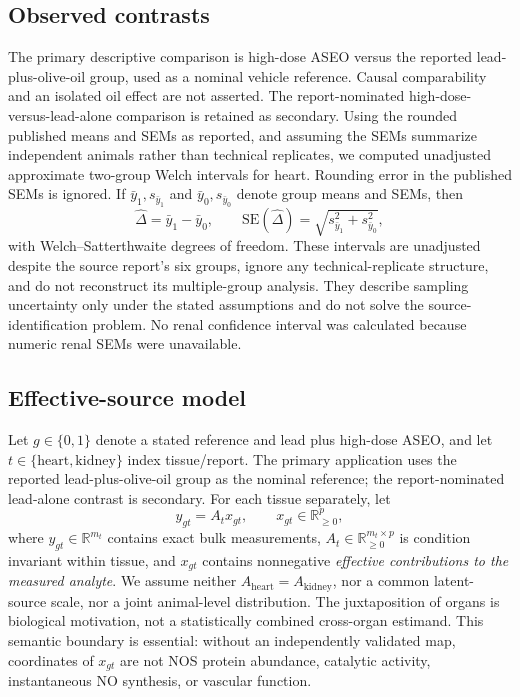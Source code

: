 \documentclass[11pt]{article}
\newcommand{\Rplus}{\mathbb{R}_{\geq 0}}
\begin{document}
\subsection{Observed contrasts}

The primary descriptive comparison is high-dose ASEO versus the reported lead-plus-olive-oil group, used as a nominal vehicle reference. Causal comparability and an isolated oil effect are not asserted. The report-nominated high-dose-versus-lead-alone comparison is retained as secondary. Using the rounded published means and SEMs as reported, and assuming the SEMs summarize independent animals rather than technical replicates, we computed unadjusted approximate two-group Welch intervals for heart. Rounding error in the published SEMs is ignored. If $\bar y_1, s_{\bar y_1}$ and $\bar y_0, s_{\bar y_0}$ denote group means and SEMs, then
\[
\widehat{\Delta}=\bar y_1-\bar y_0,\qquad
\mathrm{SE}(\widehat{\Delta})=\sqrt{s_{\bar y_1}^2+s_{\bar y_0}^2},
\]
with Welch--Satterthwaite degrees of freedom. These intervals are unadjusted despite the source report's six groups, ignore any technical-replicate structure, and do not reconstruct its multiple-group analysis. They describe sampling uncertainty only under the stated assumptions and do not solve the source-identification problem. No renal confidence interval was calculated because numeric renal SEMs were unavailable.

\subsection{Effective-source model}

Let $g\in\{0,1\}$ denote a stated reference and lead plus high-dose ASEO, and let $t\in\{\mathrm{heart},\mathrm{kidney}\}$ index tissue/report. The primary application uses the reported lead-plus-olive-oil group as the nominal reference; the report-nominated lead-alone contrast is secondary. For each tissue separately, let
\[
y_{gt}=A_t x_{gt},\qquad x_{gt}\in\Rplus^p,
\]
where $y_{gt}\in\mathbb R^{m_t}$ contains exact bulk measurements, $A_t\in\mathbb R^{m_t\times p}_{\geq0}$ is condition invariant within tissue, and $x_{gt}$ contains nonnegative \emph{effective contributions to the measured analyte}. We assume neither $A_{\mathrm{heart}}=A_{\mathrm{kidney}}$, nor a common latent-source scale, nor a joint animal-level distribution. The juxtaposition of organs is biological motivation, not a statistically combined cross-organ estimand. This semantic boundary is essential: without an independently validated map, coordinates of $x_{gt}$ are not NOS protein abundance, catalytic activity, instantaneous NO synthesis, or vascular function.
\end{document}
